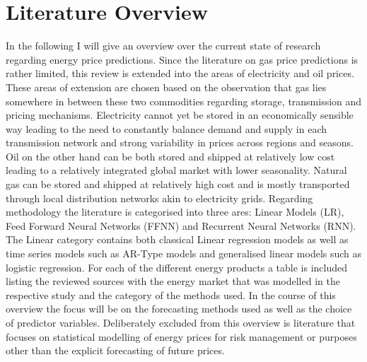 \section{Literature Overview} \label{sec:Literature}
In the following I will give an overview over the current state of research regarding energy price predictions. Since the literature on gas price predictions is rather limited, this review is extended into the areas of electricity and oil prices. 
These areas of extension are chosen based on the observation that gas lies somewhere in between these two commodities regarding storage, transmission and pricing mechanisms. Electricity cannot yet be stored in an economically sensible way leading to the need to constantly balance demand and supply in each transmission network and strong variability in prices across regions and seasons. Oil on the other hand can be both stored and shipped at relatively low cost leading to a relatively integrated global market with lower seasonality. Natural gas can be stored and shipped at relatively high cost and is mostly transported through local distribution networks akin to electricity grids. Regarding methodology the literature is categorised into three ares: Linear Models (LR), Feed Forward Neural Networks (FFNN) and Recurrent Neural Networks (RNN). The Linear category contains both classical Linear regression models as well as time series models such as AR-Type models and generalised linear models such as logistic regression. For each of the different energy products a table is included listing the reviewed sources with the energy market that was modelled in the respective study and the category of the methods used. In the course of this overview the focus will be on the forecasting methods used as well as the choice of predictor variables. Deliberately excluded from this overview is literature that focuses on statistical modelling of energy prices for risk management or purposes other than the explicit forecasting of future prices.

